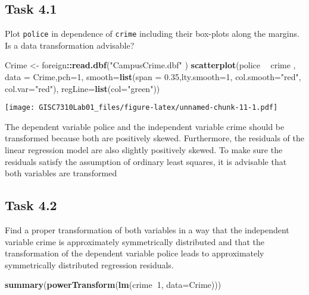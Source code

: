 \documentclass[
]{article}
\newenvironment{Shaded}{\begin{snugshade}}{\end{snugshade}}
\newcommand{\DataTypeTok}[1]{\textcolor[rgb]{0.13,0.29,0.53}{#1}}
\newcommand{\DecValTok}[1]{\textcolor[rgb]{0.00,0.00,0.81}{#1}}
\newcommand{\FloatTok}[1]{\textcolor[rgb]{0.00,0.00,0.81}{#1}}
\newcommand{\KeywordTok}[1]{\textcolor[rgb]{0.13,0.29,0.53}{\textbf{#1}}}
\newcommand{\NormalTok}[1]{#1}
\newcommand{\OperatorTok}[1]{\textcolor[rgb]{0.81,0.36,0.00}{\textbf{#1}}}
\newcommand{\StringTok}[1]{\textcolor[rgb]{0.31,0.60,0.02}{#1}}
\begin{document}
\hypertarget{task-4.1}{%
\subsection{Task 4.1}\label{task-4.1}}

Plot \texttt{police} in dependence of \texttt{crime} including their
box-plots along the margins. Is a data transformation advisable?

\begin{Shaded}
\begin{Highlighting}[]
\NormalTok{Crime <-}\StringTok{ }\NormalTok{foreign}\OperatorTok{::}\KeywordTok{read.dbf}\NormalTok{(}\StringTok{"CampusCrime.dbf"}\NormalTok{ )}
\KeywordTok{scatterplot}\NormalTok{(police }\OperatorTok{~}\StringTok{ }\NormalTok{crime , }\DataTypeTok{data =}\NormalTok{ Crime,}\DataTypeTok{pch=}\DecValTok{1}\NormalTok{, }\DataTypeTok{smooth=}\KeywordTok{list}\NormalTok{(}\DataTypeTok{span =} \FloatTok{0.35}\NormalTok{,}\DataTypeTok{lty.smooth=}\DecValTok{1}\NormalTok{, }\DataTypeTok{col.smooth=}\StringTok{"red"}\NormalTok{, }\DataTypeTok{col.var=}\StringTok{"red"}\NormalTok{),}
                  \DataTypeTok{regLine=}\KeywordTok{list}\NormalTok{(}\DataTypeTok{col=}\StringTok{"green"}\NormalTok{))}
\end{Highlighting}
\end{Shaded}

\texttt{[image: GISC7310Lab01\_files/figure-latex/unnamed-chunk-11-1.pdf]}

The dependent variable police and the independent variable crime should
be transformed because both are positively skewed. Furthermore, the
residuals of the linear regression model are also slightly positively
skewed. To make sure the residuals satisfy the assumption of ordinary
least squares, it is advisable that both variables are transformed

\hypertarget{task-4.2}{%
\subsection{Task 4.2}\label{task-4.2}}

Find a proper transformation of both variables in a way that the
independent variable crime is approximately symmetrically distributed
and that the transformation of the dependent variable police leads to
approximately symmetrically distributed regression residuals.

\begin{Shaded}
\begin{Highlighting}[]
\KeywordTok{summary}\NormalTok{(}\KeywordTok{powerTransform}\NormalTok{(}\KeywordTok{lm}\NormalTok{(crime}\OperatorTok{~}\DecValTok{1}\NormalTok{, }\DataTypeTok{data=}\NormalTok{Crime)))}
\end{Highlighting}
\end{Shaded}
\end{document}
